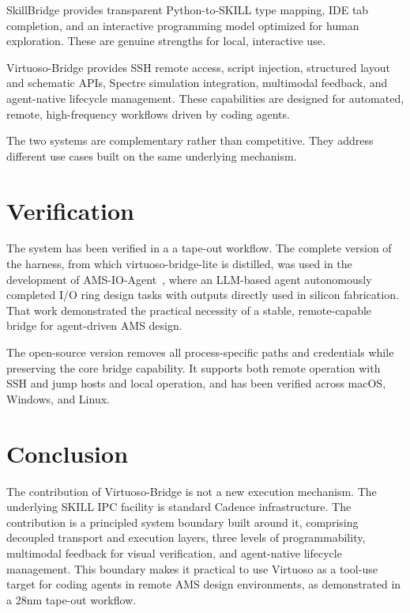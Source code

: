 \documentclass[lettersize,journal]{ieee_template/IEEEtran}
\begin{document}
SkillBridge provides transparent Python-to-SKILL type mapping, IDE tab completion, and an interactive programming model optimized for human exploration. These are genuine strengths for local, interactive use.

Virtuoso-Bridge provides SSH remote access, script injection, structured layout and schematic APIs, Spectre simulation integration, multimodal feedback, and agent-native lifecycle management. These capabilities are designed for automated, remote, high-frequency workflows driven by coding agents.

The two systems are complementary rather than competitive. They address different use cases built on the same underlying mechanism.

\section{Verification}

The system has been verified in a a tape-out workflow. The complete version of the harness, from which virtuoso-bridge-lite is distilled, was used in the development of AMS-IO-Agent~\cite{amsioagent}, where an LLM-based agent autonomously completed I/O ring design tasks with outputs directly used in silicon fabrication. That work demonstrated the practical necessity of a stable, remote-capable bridge for agent-driven AMS design.

The open-source version removes all process-specific paths and credentials while preserving the core bridge capability. It supports both remote operation with SSH and jump hosts and local operation, and has been verified across macOS, Windows, and Linux.

\section{Conclusion}

The contribution of Virtuoso-Bridge is not a new execution mechanism. The underlying SKILL IPC facility is standard Cadence infrastructure. The contribution is a principled system boundary built around it, comprising decoupled transport and execution layers, three levels of programmability, multimodal feedback for visual verification, and agent-native lifecycle management. This boundary makes it practical to use Virtuoso as a tool-use target for coding agents in remote AMS design environments, as demonstrated in a 28nm tape-out workflow.
\end{document}
